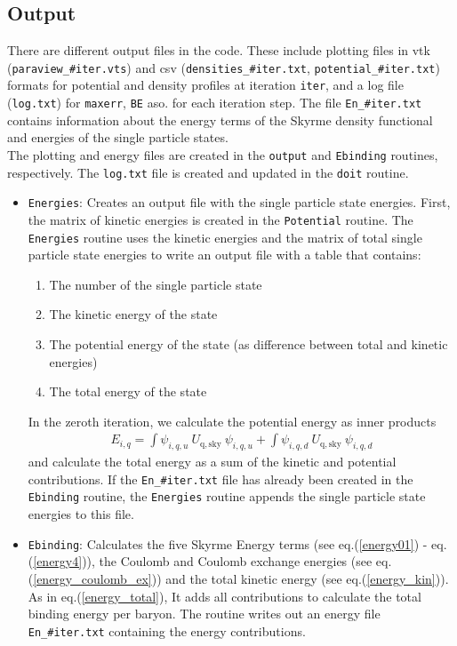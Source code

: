 \documentclass[4p]{elsarticle}
\begin{document}
\subsection{Output}
There are different output files in the code. These include plotting files in vtk (\texttt{paraview\_\#iter.vts}) and csv (\texttt{densities\_\#iter.txt}, \texttt{potential\_\#iter.txt}) formats for potential and density profiles at iteration \texttt{iter}, and a log file (\texttt{log.txt}) for \texttt{maxerr}, \texttt{BE} aso. for each iteration step. The  file \texttt{En\_\#iter.txt} contains information about the energy terms of the Skyrme density functional and energies of the single particle states. \\
The plotting and energy files are created in the \texttt{output} and \texttt{Ebinding} routines, respectively. The \texttt{log.txt} file is created and updated in the \texttt{doit} routine.
\begin{itemize}
\item \texttt{Energies}: Creates an output file with the single particle state energies. First, the matrix of kinetic energies is created in the \texttt{Potential} routine. The \texttt{Energies} routine uses the kinetic energies and the matrix of total single particle state energies to write an output file with a table that contains:
\begin{enumerate}
\item The number of the single particle state
\item The kinetic energy of the state
\item The potential energy of the state (as difference between total and kinetic energies)
\item The total energy of the state
\end{enumerate}
In the zeroth iteration, we calculate the potential energy as inner products 
\begin{align}
E_{i,q} = \int \psi_{i,q,u} \: U_\mathrm{q,sky} \:  \psi_{i, q, u} + \int \psi_{i, q, d} \: U_\mathrm{q,sky} \: \psi_{i,q,d}
\end{align}
and calculate the total energy as a sum of the kinetic and potential contributions. If the \texttt{En\_\#iter.txt} file has already been created in the \texttt{Ebinding} routine, the \texttt{Energies} routine appends the single particle state energies to this file.
\item \texttt{Ebinding}: Calculates the five Skyrme Energy terms (see eq.(\ref{energy01}) - eq.(\ref{energy4})), the Coulomb and Coulomb exchange energies (see eq.(\ref{energy_coulomb_ex})) and the total kinetic energy (see eq.(\ref{energy_kin})). As in eq.(\ref{energy_total}), It adds all contributions to calculate the total binding energy per baryon. The routine writes out an energy file \texttt{En\_\#iter.txt} containing the energy contributions. 
\end{itemize}
\end{document}

